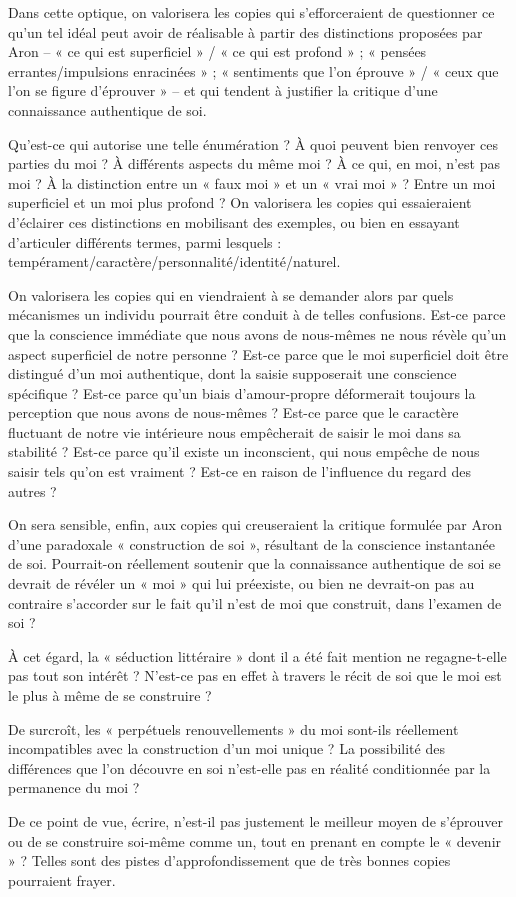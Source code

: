 {\bigskip

Dans cette optique, on valorisera les copies qui s’efforceraient de questionner ce qu’un
tel idéal peut avoir de réalisable à partir des distinctions proposées par Aron – « ce qui
est superficiel » / « ce qui est profond » ; « pensées errantes/impulsions enracinées » ;
« sentiments que l’on éprouve » / « ceux que l’on se figure d’éprouver » – et qui
tendent à justifier la critique d’une connaissance authentique de soi.

\bigskip

Qu’est-ce qui autorise une telle énumération ? À quoi peuvent bien renvoyer ces
parties du moi ? À différents aspects du même moi ? À ce qui, en moi, n’est pas moi ?
À la distinction entre un « faux moi » et un « vrai moi » ? Entre un moi superficiel et un
moi plus profond ? On valorisera les copies qui essaieraient d’éclairer ces distinctions
en mobilisant des exemples, ou bien en essayant d’articuler différents termes, parmi
lesquels : tempérament/caractère/personnalité/identité/naturel.

\bigskip

On valorisera les copies qui en viendraient à se demander alors par quels mécanismes
un individu pourrait être conduit à de telles confusions. Est-ce parce que la conscience
immédiate que nous avons de nous-mêmes ne nous révèle qu’un aspect superficiel
de notre personne ? Est-ce parce que le moi superficiel doit être distingué d’un moi
authentique, dont la saisie supposerait une conscience spécifique ? Est-ce parce
qu’un biais d’amour-propre déformerait toujours la perception que nous avons de
nous-mêmes ? Est-ce parce que le caractère fluctuant de notre vie intérieure nous
empêcherait de saisir le moi dans sa stabilité ? Est-ce parce qu’il existe un inconscient,
qui nous empêche de nous saisir tels qu’on est vraiment ? Est-ce en raison de
l’influence du regard des autres ?

\bigskip

On sera sensible, enfin, aux copies qui creuseraient la critique formulée par Aron d’une
paradoxale « construction de soi », résultant de la conscience instantanée de soi.
Pourrait-on réellement soutenir que la connaissance authentique de soi se devrait de
révéler un « moi » qui lui préexiste, ou bien ne devrait-on pas au contraire s’accorder
sur le fait qu’il n’est de moi que construit, dans l’examen de soi ?

À cet égard, la « séduction littéraire » dont il a été fait mention ne regagne-t-elle pas
tout son intérêt ? N’est-ce pas en effet à travers le récit de soi que le moi est le plus
à même de se construire ?

De surcroît, les « perpétuels renouvellements » du moi sont-ils réellement
incompatibles avec la construction d’un moi unique ? La possibilité des différences
que l’on découvre en soi n’est-elle pas en réalité conditionnée par la permanence
du moi ?

De ce point de vue, écrire, n’est-il pas justement le meilleur moyen de s’éprouver
ou de se construire soi-même comme un, tout en prenant en compte le « devenir » ?
Telles sont des pistes d’approfondissement que de très bonnes copies pourraient
frayer.
}%
